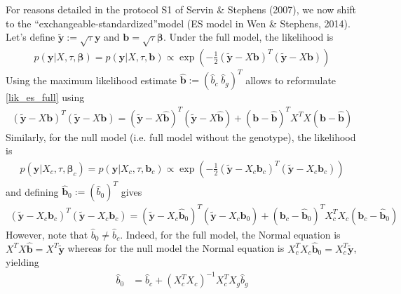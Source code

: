 \documentclass[10pt]{article}
\begin{document}
For reasons detailed in the protocol S1 of Servin \& Stephens (2007), we now shift to the ``exchangeable-standardized''model (ES model in Wen \& Stephens, 2014).
Let's define $\tilde{\bm{y}} := \sqrt{\tau}\bm{y}$ and $\bm{b} = \sqrt{\tau} \bm{\beta}$.
Under the full model, the likelihood is
\begin{equation}
  \begin{aligned}
    p(\bm{y} | X, \tau, \bm{\beta}) = p(\bm{y} | X, \tau, \bm{b}) \propto \exp \left( -\frac{1}{2} (\tilde{\bm{y}} - X \bm{b})^T (\tilde{\bm{y}} - X \bm{b}) \right)
    \label{lik_es_full}
  \end{aligned}
\end{equation}
Using the maximum likelihood estimate $\hat{\bm{b}} := (\hat{b}_c \; \hat{b}_g)^T$ allows to reformulate \eqref{lik_es_full} using
\begin{equation}
  \begin{aligned}
    (\tilde{\bm{y}} - X \bm{b})^T (\tilde{\bm{y}} - X \bm{b}) = (\tilde{\bm{y}} - X \hat{\bm{b}})^T (\tilde{\bm{y}} - X \hat{\bm{b}}) + (\bm{b} - \hat{\bm{b}})^T X^T X (\bm{b} - \hat{\bm{b}})
    \label{lik_es_full_ker}
  \end{aligned}
\end{equation}
Similarly, for the null model (i.e. full model without the genotype), the likelihood is
\begin{equation}
  \begin{aligned}
    p(\bm{y} | X_c, \tau, \bm{\beta}_c) = p(\bm{y} | X_c, \tau, \bm{b}_c) \propto \exp \left( -\frac{1}{2} (\tilde{\bm{y}} - X_c \bm{b}_c)^T (\tilde{\bm{y}} - X_c \bm{b}_c) \right)
    \label{lik_es_null}
  \end{aligned}
\end{equation}
and defining $\hat{\bm{b}}_0 := (\hat{b}_0)^T$ gives
\begin{equation}
  \begin{aligned}
    (\tilde{\bm{y}} - X_c \bm{b}_c)^T (\tilde{\bm{y}} - X_c \bm{b}_c) = (\tilde{\bm{y}} - X_c \hat{\bm{b}}_0)^T (\tilde{\bm{y}} - X_c \hat{\bm{b}}_0) + (\bm{b}_c - \hat{\bm{b}}_0)^T X_c^T X_c (\bm{b}_c - \hat{\bm{b}}_0)
    \label{lik_es_null_ker}
  \end{aligned}
\end{equation}
However, note that $\hat{b}_0 \neq \hat{b}_c$.
Indeed, for the full model, the Normal equation is $X^T X \hat{\bm{b}} = X^T \tilde{\bm{y}}$ whereas for the null model the Normal equation is $X_c^T X_c \hat{\bm{b}}_0 = X_c^T \tilde{\bm{y}}$, yielding
\begin{equation}
  \begin{aligned}
    \hat{b}_0 &= \hat{b}_c + (X_c^T X_c)^{-1} X_c^T X_g \hat{b}_g
    \label{mle_es_null}
  \end{aligned}
\end{equation}
\end{document}
